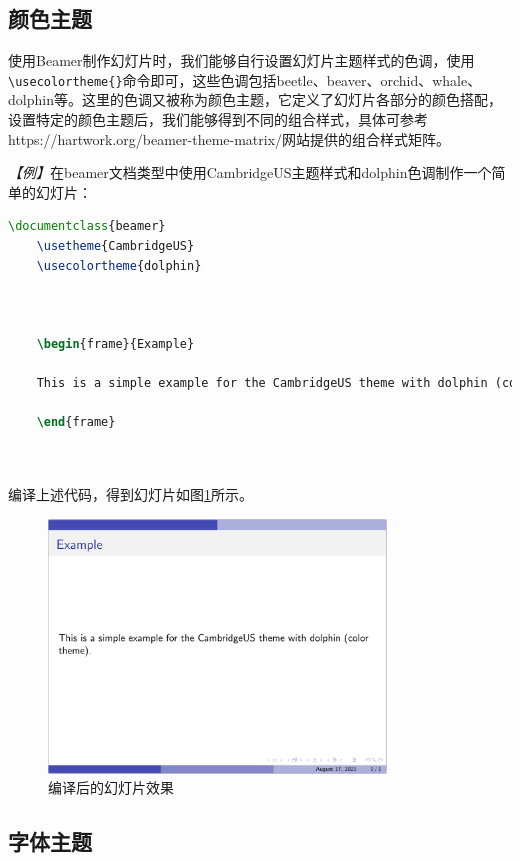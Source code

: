 \subsection{颜色主题}

使用Beamer制作幻灯片时，我们能够自行设置幻灯片主题样式的色调，使用\texttt{\textbackslash{}usecolortheme\{\}}命令即可，这些色调包括beetle、beaver、orchid、whale、dolphin等。这里的色调又被称为颜色主题，它定义了幻灯片各部分的颜色搭配，设置特定的颜色主题后，我们能够得到不同的组合样式，具体可参考https://hartwork.org/beamer-theme-matrix/网站提供的组合样式矩阵。

\emph{【例】}在beamer文档类型中使用CambridgeUS主题样式和dolphin色调制作一个简单的幻灯片：
\begin{lstlisting}[language=TeX]
    \documentclass{beamer}
    \usetheme{CambridgeUS}
    \usecolortheme{dolphin}

    

    \begin{frame}{Example}

    This is a simple example for the CambridgeUS theme with dolphin (color theme).

    \end{frame}

    
\end{lstlisting}

编译上述代码，得到幻灯片如图\ref{figeg:003}所示。

\begin{figure}[htbp]
    \centering
    \includegraphics[width = 0.8\textwidth]{images/ch_9/example_sec2_2.png}
    \caption{编译后的幻灯片效果}
    \label{figeg:003}
\end{figure}

\subsection{字体主题}

